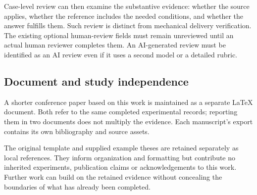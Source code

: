 Case-level review can then examine the substantive evidence: whether the source applies, whether the reference includes the needed conditions, and whether the answer fulfills them. Such review is distinct from mechanical delivery verification. The existing optional human-review fields must remain unreviewed until an actual human reviewer completes them. An AI-generated review must be identified as an AI review even if it uses a second model or a detailed rubric.

\subsection{Document and study independence}

A shorter conference paper based on this work is maintained as a separate LaTeX document. Both refer to the same completed experimental records; reporting them in two documents does not multiply the evidence. Each manuscript's export contains its own bibliography and source assets.

The original template and supplied example theses are retained separately as local references. They inform organization and formatting but contribute no inherited experiments, publication claims or acknowledgements to this work. Further work can build on the retained evidence without concealing the boundaries of what has already been completed.
